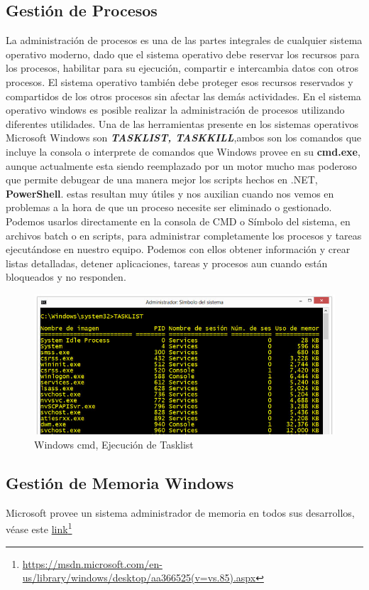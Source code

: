 \documentclass[paper=a4, fontsize=12pt]{article} 		%
\newcommand\fnurl[2]{%
\href{#2}{#1}\footnote{\url{#2}}%
}
\numberwithin{equation}{section}						%
\numberwithin{table}{section} 							%
\begin{document}
\subsection{Gestión de Procesos}
La administración de procesos es una de las partes integrales de cualquier sistema operativo moderno, dado que el sistema operativo debe reservar los recursos para los procesos, habilitar para su ejecución, compartir e intercambia datos con otros procesos. El sistema operativo también debe proteger esos recursos reservados y compartidos de los otros procesos sin afectar las demás actividades.
En el sistema operativo windows es posible realizar la administración de procesos utilizando diferentes utilidades.
Una de las herramientas presente en los sistemas operativos Microsoft Windows son \textbf{\textit{TASKLIST, TASKKILL}},ambos son los comandos que incluye la consola o interprete de comandos que Windows provee en su \textbf{cmd.exe}, aunque actualmente esta siendo reemplazado por un motor mucho mas poderoso que permite debugear de una manera mejor los scripts hechos en .NET, \textbf{PowerShell}. estas resultan muy útiles y nos auxilian cuando nos vemos en problemas a la hora de que un proceso necesite ser eliminado o gestionado. Podemos usarlos directamente en la consola de CMD o Símbolo del sistema, en archivos batch o en scripts, para administrar completamente los procesos y tareas ejecutándose en nuestro equipo. Podemos con ellos obtener información y crear listas detalladas, detener aplicaciones, tareas y procesos aun cuando están bloqueados y no responden. 
\begin{figure}[H]
 \centering
\includegraphics[scale=0.35]{img/task.jpg}
\caption{Windows cmd, Ejecución de Tasklist}
\label{fig:dis2}
\end{figure}
\subsection{Gestión de Memoria Windows}
Microsoft provee un sistema administrador de memoria en todos sus desarrollos, véase este \fnurl{link}{https://msdn.microsoft.com/en-us/library/windows/desktop/aa366525(v=vs.85).aspx} 
\end{document}
